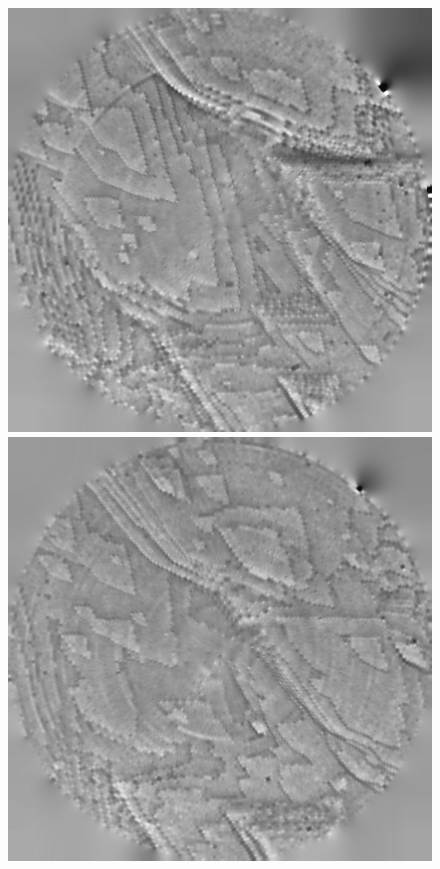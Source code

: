 \begin{figure}[!ht]
\centering
{}
  	\includegraphics[width=\linewidth]{images/006_X10s50l10m_MOv2_457.png}
\endminipage\hfill
{}
  	\includegraphics[width=\linewidth]{images/006_X10s50l10m_MOv2_698.png}

\end{figure}
